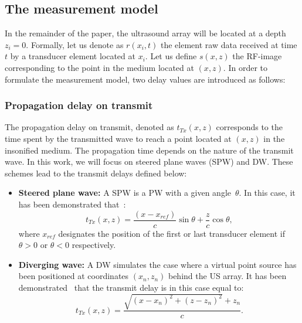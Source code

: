 \documentclass[conference]{IEEEtran}
\begin{document}
\subsection{The measurement model}
\label{subsec:meas_model}
\par In the remainder of the paper, the ultrasound array will be located at a depth $z_i = 0$. Formally, let us denote as $r \left(x_i, t\right)$ the element raw data received at time $t$ by a transducer element located at $x_i$. Let us define $s \left(x, z\right)$ the RF-image corresponding to the point in the medium located at $\left(x, z\right)$. 
In order to formulate the measurement model, two delay values are introduced as follows:
\subsubsection{Propagation delay on transmit}
\label{subsubsec_transmit_delay}
\par The propagation delay on transmit, denoted as $t_{Tx} \left(x, z\right)$ corresponds to the time spent by the transmitted wave to reach a point located at $\left(x, z\right)$ in the insonified medium. The propagation time depends on the nature of the transmit wave. In this work, we will focus on steered plane waves (SPW) and DW. These schemes lead to the transmit delays defined below:
\begin{itemize}
	\item \textbf{Steered plane wave:} A SPW is a PW with a given angle~$\theta$. In this case, it has been demonstrated that~\cite{montaldo_uffc_2014}: 
	\begin{equation}
	\label{eq_transmit_delay_steered_PW}
	t_{Tx} \left(x, z \right) = \frac{\left(x - x_{ref}\right)}{c} \sin \theta + \frac{z}{c} \cos \theta,
	\end{equation}
	where $x_{ref}$ designates the position of the first or last transducer element if $\theta > 0$ or $\theta < 0$ respectively. 
	\item \textbf{Diverging wave:} A DW simulates the case where a virtual point source has been positioned at coordinates $\left( x_n, z_n \right)$ behind the US array. It has been demonstrated~\cite{Zhang_IUS_2015} 
	that the transmit delay is in this case equal to:
	\begin{equation}
	\label{eq_transmit_delay_DW}
	t_{Tx} \left(x, z \right) = \frac{\sqrt{\left( x - x_n\right)^2 + \left( z - z_n\right)^2} + z_n}{c}.
	\end{equation}
\end{itemize}
\end{document}
